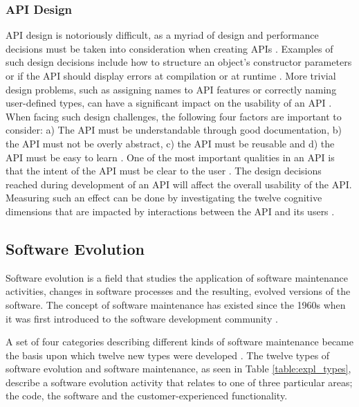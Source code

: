 \documentclass{sig-alternate}
\begin{document}
\subsubsection{API Design} \label{api_design}
API design is notoriously difficult, as a myriad of design and performance decisions must be taken into consideration when creating APIs \cite{afonso2012evaluating, bloch2008effective, stylos2006comparing}. Examples of such design decisions include how to structure an object's constructor parameters or if the API should display errors at compilation or at runtime \cite{stylos2006comparing}. More trivial design problems, such as assigning names to API features or correctly naming user-defined types, can have a significant impact on the usability of an API \cite{shi2011empirical}. When facing such design challenges, the following four factors are important to consider: a) The API must be understandable through good documentation, b) the API must not be overly abstract, c) the API must be reusable and d) the API must be easy to learn \cite{shi2011empirical}. One of the most important qualities in an API is that the intent of the API must be clear to the user \cite{shi2011empirical, stylos2006comparing}. The design decisions reached during development of an API will affect the overall usability of the API. Measuring such an effect can be done by investigating the twelve cognitive dimensions that are impacted by interactions between the API and its users \cite{clarke2004measuring}. 


\subsection{Software Evolution} \label{software_evolution}
Software evolution is a field that studies the application of software maintenance activities, changes in software processes and the resulting, evolved versions of the software. The concept of software maintenance has existed since the 1960s when it was first introduced to the software development community \cite{lientz1980software}. 

A set of four categories describing different kinds of software maintenance \cite{lientz1980software} became the basis upon which twelve new types were developed \cite{chapin2001types}. The twelve types of software evolution and software maintenance, as seen in Table \ref{table:expl_types}, describe a software evolution activity that relates to one of three particular areas; the code, the software and the customer-experienced functionality. 
\end{document}
